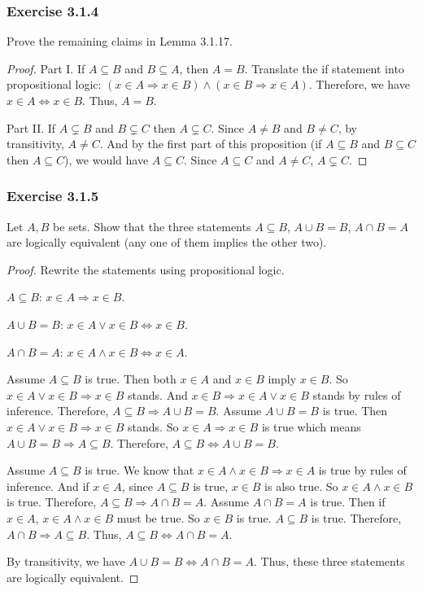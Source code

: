 \documentclass[12pt, letter]{article}
\begin{document}
\subsubsection*{Exercise 3.1.4}
Prove the remaining claims in Lemma 3.1.17.
\begin{proof}
    Part I. If $A\subseteq B$ and $B\subseteq A$, then $A=B$. Translate the if statement into propositional logic: $(x\in A \Rightarrow x\in B) \wedge (x\in B\Rightarrow x\in A)$. Therefore, we have $x\in A\iff x\in B$. Thus, $A=B$.

    Part II. If $A\subsetneq B$ and $B\subsetneq C$ then $A\subsetneq C$. Since $A\ne B$ and $B\ne C$, by transitivity, $A\ne C$. And by the first part of this proposition (if $A\subseteq B$ and $B\subseteq C$ then $A\subseteq C$), we would have $A\subseteq C$. Since $A\subseteq C$ and $A\ne C$, $A\subsetneq C$.
\end{proof}
\subsubsection*{Exercise 3.1.5}
Let $A,B$ be sets. Show that the three statements $A\subseteq B$, $A\cup B=B$, $A\cap B=A$ are logically equivalent (any one of them implies the other two).
\begin{proof}
    Rewrite the statements using propositional logic.

    $A\subseteq B$: $x\in A\Rightarrow x\in B$.

    $A\cup B=B$: $x\in A\lor x\in B\iff x\in B$.

    $A\cap B=A$: $x\in A\land x\in B\iff x\in A$.

    Assume $A\subseteq B$ is true. Then both $x\in A$ and $x\in B$ imply $x\in B$. So $x\in A\lor x\in B\Rightarrow x\in B$ stands. And $x\in B\Rightarrow x\in A\lor x\in B$ stands by rules of inference. Therefore, $A\subseteq B\Rightarrow A\cup B=B$. Assume $A\cup B=B$ is true. Then $x\in A\lor x\in B\Rightarrow x\in B$ stands. So $x\in A\Rightarrow x\in B$ is true which means $A\cup B=B\Rightarrow A\subseteq B$. Therefore, 
    $A\subseteq B\iff A\cup B=B$.

    Assume $A\subseteq B$ is true. We know that $x\in A\land x\in B\Rightarrow x\in A$ is true by rules of inference. And if $x\in A$, since $A\subseteq B$ is true, $x\in B$ is also true. So $x\in A\land x\in B$ is true. Therefore, $A\subseteq B\Rightarrow A\cap B=A$.
    Assume $A\cap B=A$ is true. Then if $x\in A$, $x\in A\land x\in B$ must be true. So $x\in B$ is true. $A\subseteq B$ is true. Therefore, $A\cap B\Rightarrow A\subseteq B$. Thus, $A\subseteq B\iff A\cap B=A$.
    
    By transitivity, we have $A\cup B=B\iff A\cap B=A$. Thus, these three statements are logically equivalent.
\end{proof}
\end{document}
